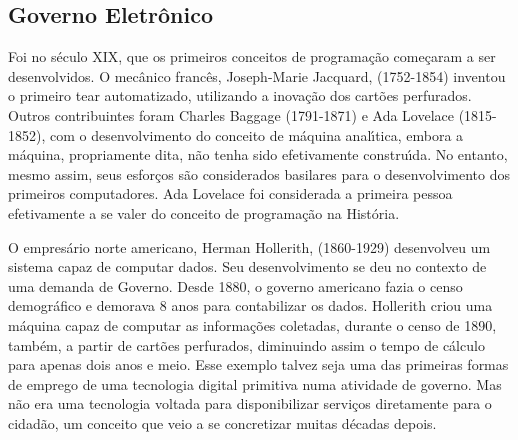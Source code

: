 \documentclass[
12pt,		%
openright,	%
twoside,  %
a4paper,			%
chapter=TITLE,		%
english,			%
french,				%
spanish,			%
brazil				%
]{USPSC-classe/USPSC}
\begin{document}
\noindent\begin{center}\mbox{\centering{}}\end{center}


\subsection[Governo Eletr\^onico]{Governo Eletr\^onico}\label{Governo Eletr\^onico}
Foi no s\'eculo XIX, que os primeiros conceitos de programa\c{c}\~ao come\c{c}aram a ser desenvolvidos. O mec\^anico franc\^es, Joseph-Marie Jacquard, (1752-1854) inventou o primeiro tear automatizado, utilizando a inova\c{c}\~ao dos cart\~oes perfurados. Outros contribuintes foram Charles Baggage (1791-1871) e Ada Lovelace (1815-1852), com o desenvolvimento do conceito de m\'aquina anal\'{\i}tica, embora a m\'aquina, propriamente dita, n\~ao tenha sido efetivamente constru\'{\i}da. No entanto, mesmo assim, seus esfor\c{c}os s\~ao considerados basilares para o desenvolvimento dos primeiros computadores. Ada Lovelace foi considerada a primeira pessoa efetivamente a se valer do conceito de programa\c{c}\~ao na Hist\'oria.









O empres\'ario norte americano, Herman Hollerith, (1860-1929) desenvolveu um sistema capaz de computar dados. Seu desenvolvimento se deu no contexto de uma demanda de Governo. Desde 1880, o governo americano fazia o censo demogr\'afico e demorava 8 anos para contabilizar os dados. Hollerith criou uma m\'aquina capaz de computar as informa\c{c}\~oes coletadas, durante o censo de 1890, tamb\'em, a partir de cart\~oes perfurados, diminuindo assim o tempo de c\'alculo para apenas dois anos e meio. Esse exemplo talvez seja uma das primeiras formas de emprego de uma tecnologia digital primitiva numa atividade de governo. Mas n\~ao era uma tecnologia voltada para disponibilizar servi\c{c}os diretamente para o cidad\~ao, um conceito que veio a se concretizar muitas d\'ecadas depois.
\end{document}
